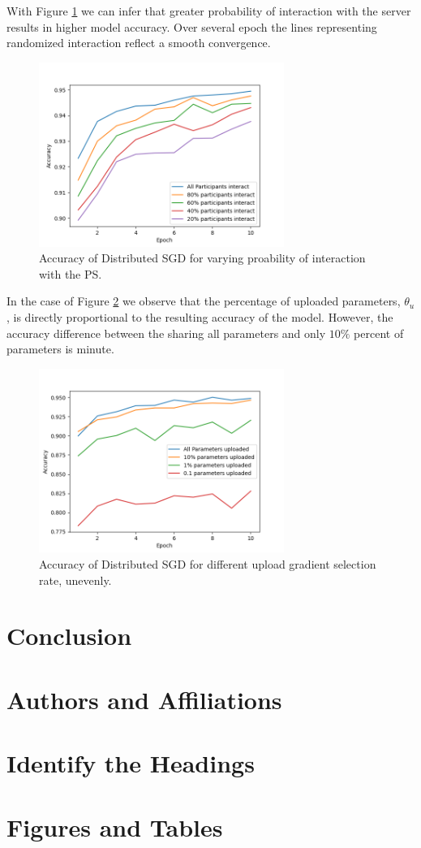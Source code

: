 \documentclass[conference]{IEEEtran}
\begin{document}
With Figure \ref{fig:VaryingProbabilityInteraction} we can infer that greater probability of interaction with the server results in higher model accuracy. Over several epoch the lines representing randomized interaction reflect a smooth convergence.

\begin{figure}[!h]
\includegraphics[width=8cm, keepaspectratio]{VaryingProbabilityInteraction}
\caption{Accuracy of Distributed SGD for varying proability of interaction with the PS. }
\label{fig:VaryingProbabilityInteraction}
\end{figure}

In the case of Figure \ref{fig:VaryingThetaU} we observe that the percentage of uploaded parameters, $\theta_u$, is directly proportional to the resulting accuracy of the model. However, the accuracy difference between the sharing all parameters and only $ 10\% $ percent of parameters is minute.


\begin{figure}[!h]
\includegraphics[width=8cm, keepaspectratio]{VaryingThetaU}
\caption{Accuracy of Distributed SGD for different upload gradient selection rate, unevenly. }
\label{fig:VaryingThetaU}
\end{figure}


\section{Conclusion}


\section{Authors and Affiliations}


\section{Identify the Headings}


\section{Figures and Tables}





\end{document}
